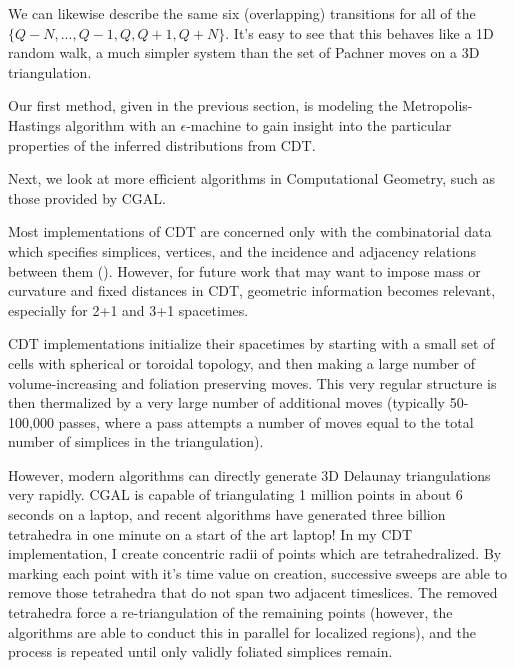 \documentclass[12pt]{article}
\makeatletter
\def\section{\@startsection{section}{1}{\z@}{3.5ex plus 1ex minus
   .2ex}{2.3ex plus .2ex}{\large\bf}}
\makeatother
\begin{document}
  We can likewise describe the same six (overlapping) transitions for all of the $\{Q-N,...,Q-1,Q,Q+1,Q+N\}$.
  It's easy to see that this behaves like a 1D random walk, a much simpler system than the set of Pachner moves on a 3D triangulation.

\section{Methods}

Our first method, given in the previous section, is modeling the Metropolis-Hastings algorithm with an $\epsilon$-machine to gain insight into
the particular properties of the inferred distributions from CDT.

Next, we look at more efficient algorithms in Computational Geometry, such as those provided by CGAL.

Most implementations of CDT are concerned only with the combinatorial data which specifies simplices, vertices, and the incidence and adjacency relations
between them (). However, for future work that may want to impose mass or curvature and fixed distances in CDT, geometric information becomes relevant, especially for 2+1 and 3+1 spacetimes. \cite{cgal:pt-t3-18a,cgal:hdj-t-18a}

CDT implementations initialize their spacetimes by starting with a small set of cells with spherical or toroidal topology, and then making a large number
of volume-increasing and foliation preserving moves. This very regular structure is then thermalized by a very large number of additional moves (typically 50-100,000 passes, where a pass attempts a number of moves equal to the total number of simplices in the triangulation).

However, modern algorithms can directly generate 3D Delaunay triangulations very rapidly. CGAL is capable of triangulating 1 million points in about 6
seconds on a laptop, and recent algorithms have generated three billion tetrahedra in one minute on a start of the art laptop! \cite{marot_one_2018}
In my CDT implementation, I create concentric radii of points which are tetrahedralized. By marking each point with it's time value on creation,
successive sweeps are able to remove those tetrahedra that do not span two adjacent timeslices. The removed tetrahedra force a re-triangulation of the
remaining points (however, the algorithms are able to conduct this in parallel for localized regions), and the process is repeated until only validly foliated simplices remain.
\end{document}
